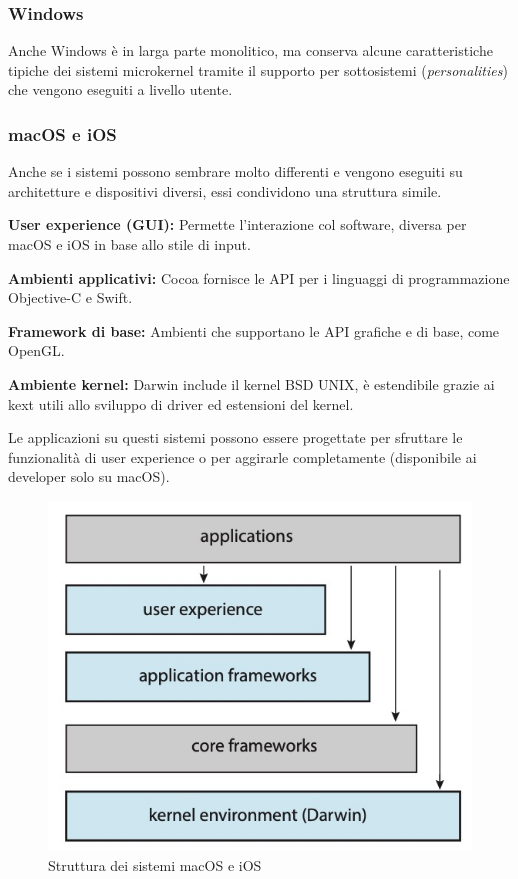 \subsubsection*{Windows}
Anche Windows è in larga parte monolitico, ma conserva alcune caratteristiche tipiche dei sistemi microkernel tramite il supporto per sottosistemi (\textit{personalities}) che vengono eseguiti a livello utente.

\subsubsection*{macOS e iOS}
Anche se i sistemi possono sembrare molto differenti e vengono eseguiti su architetture e dispositivi diversi, essi condividono una struttura simile.

\spacer
\begin{sitemize}
    \item \textbf{User experience (GUI):} Permette l'interazione col software, diversa per macOS e iOS in base allo stile di input.
    \item \textbf{Ambienti applicativi:} Cocoa fornisce le API per i linguaggi di programmazione Objective-C e Swift.
    \item \textbf{Framework di base:} Ambienti che supportano le API grafiche e di base, come OpenGL.
    \item \textbf{Ambiente kernel:} Darwin include il kernel BSD UNIX, è estendibile grazie ai kext utili allo sviluppo di driver ed estensioni del kernel.
\end{sitemize}
\spacer

Le applicazioni su questi sistemi possono essere progettate per sfruttare le funzionalità di user experience o per aggirarle completamente (disponibile ai developer solo su macOS).

\begin{figure}[H]
    \centering
    \includegraphics[width=0.4\linewidth]{assets/apple-os-structure.jpg}
    \caption{Struttura dei sistemi macOS e iOS}
\end{figure}

